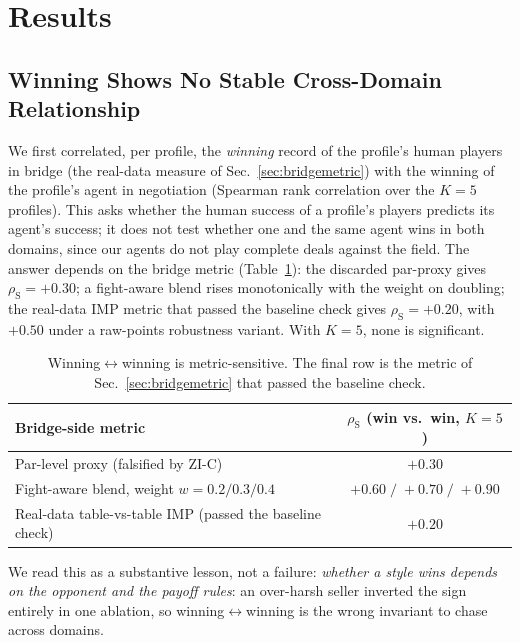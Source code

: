\documentclass[11pt,a4paper]{article}
\newcommand{\rhoS}{\rho_{\mathrm{S}}}
\begin{document}
\section{Results}\label{sec:results}

\subsection{Winning Shows No Stable Cross-Domain Relationship}\label{sec:winning}

We first correlated, per profile, the \emph{winning} record of the
profile's human players in bridge (the real-data measure of
Sec.~\ref{sec:bridgemetric}) with the winning of the profile's agent in
negotiation (Spearman rank correlation \cite{spearman1904proof} over
the $K=5$ profiles). This
asks whether the human success of a profile's players predicts its
agent's success; it does not test whether one and the same agent wins
in both domains, since our agents do not play complete deals against
the field. The answer depends on the bridge metric
(Table~\ref{tab:sensitivity}): the discarded par-proxy gives
$\rhoS=+0.30$; a fight-aware blend rises monotonically with the weight
on doubling; the real-data IMP metric that passed the baseline check gives $\rhoS=+0.20$,
with $+0.50$ under a raw-points robustness variant. With
$K=5$, none is significant.

\begin{table}[h]
\centering\small
\caption{Winning$\leftrightarrow$winning is metric-sensitive.
The final row is the metric of Sec.~\ref{sec:bridgemetric} that passed
the baseline check.}
\label{tab:sensitivity}
\begin{tabular}{lc}
\toprule
Bridge-side metric & $\rhoS$ (win vs.\ win, $K=5$)\\
\midrule
Par-level proxy (falsified by ZI-C) & $+0.30$\\
Fight-aware blend, weight $w=0.2 / 0.3 / 0.4$ & $+0.60\; /\; +0.70\; /\; +0.90$\\
Real-data table-vs-table IMP (passed the baseline check) & $\mathbf{+0.20}$\\
\bottomrule
\end{tabular}
\end{table}

We read this as a substantive lesson, not a failure: \emph{whether a
style wins depends on the opponent and the payoff rules}: an over-harsh seller inverted the sign entirely in one ablation, so
winning$\leftrightarrow$winning is the wrong invariant to chase across
domains.
\end{document}
